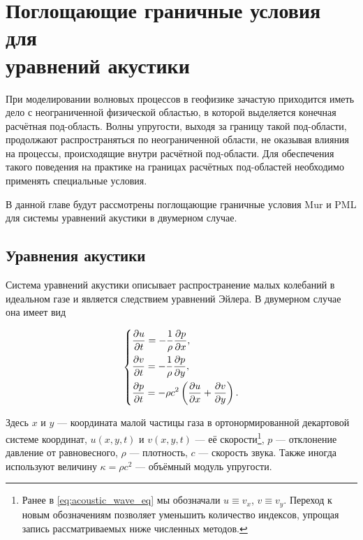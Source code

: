 \section[Поглощающие граничные условия для уравнений акустики]{Поглощающие граничные условия для\\уравнений акустики} \label{sec:absorbing}

При моделировании волновых процессов в геофизике зачастую приходится иметь дело с неограниченной физической областью, в которой выделяется конечная расчётная под-область. Волны упругости, выходя за границу такой под-области, продолжают распространяться по неограниченной области, не оказывая влияния на процессы, происходящие внутри расчётной под-области. Для обеспечения такого поведения на практике на границах расчётных под-областей необходимо применять специальные условия.

В данной главе будут рассмотрены поглощающие граничные условия Mur и PML для системы уравнений акустики в двумерном случае.

\subsection{Уравнения акустики}

Система уравнений акустики описывает распространение малых колебаний в идеальном газе и является следствием уравнений Эйлера. В двумерном случае она имеет вид

\begin{equation}
\begin{dcases}
	\frac{\partial u}{\partial t} = -\frac{1}{\rho}\frac{\partial p}{\partial x} , \\
	\frac{\partial v}{\partial t} = -\frac{1}{\rho}\frac{\partial p}{\partial y} , \\
    \frac{\partial p}{\partial t} = -\rho c^2 \left(\frac{\partial u}{\partial x} + \frac{\partial v}{\partial y}\right) . \\
\end{dcases}
\label{eq:acoustic}
\end{equation}

\noindent Здесь $x$ и $y$ --- координата малой частицы газа в ортонормированной декартовой системе координат, $u(x,y,t)$ и $v(x,y,t)$ --- её скорости\footnote{Ранее в \eqref{eq:acoustic_wave_eq} мы обозначали $u\equiv v_x$, $v\equiv v_y$. Переход к новым обозначениям позволяет уменьшить количество индексов, упрощая запись рассматриваемых ниже численных методов.}, $p$ --- отклонение давление от равновесного, $\rho$ --- плотность, $c$ --- скорость звука. Также иногда используют величину $\kappa = \rho c^2$ --- объёмный модуль упругости.

